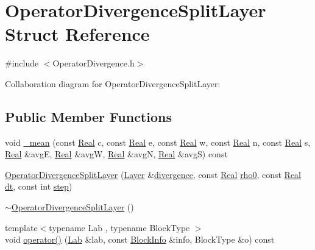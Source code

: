 \hypertarget{struct_operator_divergence_split_layer}{}\section{Operator\+Divergence\+Split\+Layer Struct Reference}
\label{struct_operator_divergence_split_layer}


{\ttfamily \#include $<$Operator\+Divergence.\+h$>$}



Collaboration diagram for Operator\+Divergence\+Split\+Layer\+:
\subsection*{Public Member Functions}
\begin{DoxyCompactItemize}
\item 
void \hyperlink{struct_operator_divergence_split_layer_a295391ce7409255d79703a289fed4e7b}{\+\_\+mean} (const \hyperlink{_h_d_f5_dumper_8h_a445a5f0e2a34c9d97d69a3c2d1957907}{Real} c, const \hyperlink{_h_d_f5_dumper_8h_a445a5f0e2a34c9d97d69a3c2d1957907}{Real} e, const \hyperlink{_h_d_f5_dumper_8h_a445a5f0e2a34c9d97d69a3c2d1957907}{Real} w, const \hyperlink{_h_d_f5_dumper_8h_a445a5f0e2a34c9d97d69a3c2d1957907}{Real} n, const \hyperlink{_h_d_f5_dumper_8h_a445a5f0e2a34c9d97d69a3c2d1957907}{Real} s, \hyperlink{_h_d_f5_dumper_8h_a445a5f0e2a34c9d97d69a3c2d1957907}{Real} \&avg\+E, \hyperlink{_h_d_f5_dumper_8h_a445a5f0e2a34c9d97d69a3c2d1957907}{Real} \&avg\+W, \hyperlink{_h_d_f5_dumper_8h_a445a5f0e2a34c9d97d69a3c2d1957907}{Real} \&avg\+N, \hyperlink{_h_d_f5_dumper_8h_a445a5f0e2a34c9d97d69a3c2d1957907}{Real} \&avg\+S) const 
\item 
\hyperlink{struct_operator_divergence_split_layer_adb870cc91b9c8ac69230cf5f35b625db}{Operator\+Divergence\+Split\+Layer} (\hyperlink{struct_layer}{Layer} \&\hyperlink{struct_operator_divergence_split_layer_a3a87749be5cb9a36faa6bb9b181eed6a}{divergence}, const \hyperlink{_h_d_f5_dumper_8h_a445a5f0e2a34c9d97d69a3c2d1957907}{Real} \hyperlink{struct_operator_divergence_split_layer_acb5c6d750885812f5d90eca819c596a4}{rho0}, const \hyperlink{_h_d_f5_dumper_8h_a445a5f0e2a34c9d97d69a3c2d1957907}{Real} \hyperlink{struct_operator_divergence_split_layer_a59181ec749701cf53d055a6e75e5486c}{dt}, const int \hyperlink{struct_operator_divergence_split_layer_a40f9ce0dcd01080cc50c0ce22a4a3eb4}{step})
\item 
\hyperlink{struct_operator_divergence_split_layer_a72db398a6d2ecb9ac29b6db752802bda}{$\sim$\+Operator\+Divergence\+Split\+Layer} ()
\item 
{\footnotesize template$<$typename Lab , typename Block\+Type $>$ }\\void \hyperlink{struct_operator_divergence_split_layer_a87a9676b91dbe960ebcb4a00463e4aa6}{operator()} (\hyperlink{_definitions_8h_ad6f951af9a2a6ebc1975404882b34314}{Lab} \&lab, const \hyperlink{struct_block_info}{Block\+Info} \&info, Block\+Type \&o) const 
\end{DoxyCompactItemize}

